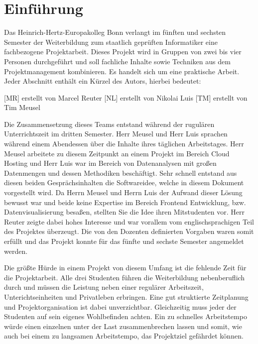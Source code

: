 \section{Einführung}
\label{sec:einfuehrung}
Das Heinrich-Hertz-Europakolleg Bonn verlangt im fünften und sechsten Semester
der Weiterbildung zum staatlich geprüften Informatiker eine fachbezogene
Projektarbeit. Dieses Projekt wird in Gruppen von zwei bis vier Personen
durchgeführt und soll fachliche Inhalte sowie Techniken aus dem Projektmanagement
kombinieren. Es handelt sich um eine praktische Arbeit. Jeder Abschnitt enthält
ein Kürzel des Autors, hierbei bedeutet:

\begin{outline}
  \1 {[MR]} erstellt von Marcel Reuter
  \1 {[NL]} erstellt von Nikolai Luis
  \1 {[TM]} erstellt von Tim Meusel
\end{outline}

Die Zusammensetzung dieses Teams entstand während der rugulären
Unterrichtszeit im dritten Semester. Herr Meusel und Herr Luis
sprachen während einem Abendessen über die Inhalte ihres täglichen
Arbeitstages. Herr Meusel arbeitete zu diesem Zeitpunkt an einem Projekt
im Bereich Cloud Hosting und Herr Luis war im Bereich von Datenanalysen
mit großen Datenmengen und dessen Methodiken beschäftigt. Sehr schnell entstand
aus diesen beiden Gesprächsinhalten die Softwareidee, welche in diesem
Dokument vorgestellt wird. Da Herrn Meusel und Herrn Luis der Aufwand
dieser Lösung bewusst war und beide keine Expertise im Bereich Frontend
Entwicklung, bzw. Datenvisualisierung besaßen, stellten Sie die Idee ihren
Mitstudenten vor. Herr Reuter zeigte dabei hohes Interesse und war vorallem
vom englischsprachigen Teil des Projektes überzeugt. Die von den Dozenten
definierten Vorgaben waren somit erfüllt und das Projekt konnte für das
fünfte und sechste Semester angemeldet werden.

Die größte Hürde in einem Projekt von diesem Umfang ist die fehlende Zeit für
die Projektarbeit. Alle drei Studenten führen die Weiterbildung nebenberuflich
durch und müssen die Leistung neben einer regulärer Arbeitszeit,
Unterichtseinheiten und Privatleben erbringen. Eine gut struktierte
Zeitplanung und Projektorganisation ist dabei unverzichtbar. Gleichzeitig
muss jeder der Studenten auf sein eigenes Wohlbefinden achten. Ein zu
schnelles Arbeitstempo würde einen einzelnen unter der Last zusammenbrechen
lassen und somit, wie auch bei einem zu langsamen Arbeitstempo, das Projektziel
gefährdet können.

